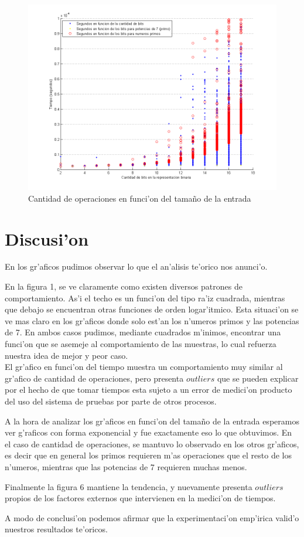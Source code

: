 \begin{figure}[H]
\centering
\includegraphics[scale=0.7]{../../codigo/ejercicio1/benchmark_de_tiempo/graficos/tamanio_Entrada_T/Tiempo_en_funcion_bits.png}
\caption{Cantidad de operaciones en funci'on del tama\~{n}o de la entrada}
\end{figure}

\section{Discusi'on}
En los gr'aficos pudimos observar lo que el an'alisis te'orico nos anunci'o.

En la figura 1, se ve claramente como existen diversos patrones de comportamiento. As'i el techo es un funci'on del tipo ra'iz 
cuadrada, mientras que debajo se encuentran otras funciones de orden logar'itmico. Esta situaci'on se ve mas claro en los 
gr'aficos donde solo est'an los n'umeros primos y las potencias de 7. En ambos casos pudimos, mediante cuadrados m'inimos, 
encontrar una funci'on que se asemeje al comportamiento de las muestras, lo cual refuerza nuestra idea de mejor y peor caso.\\
El gr'afico en funci'on del tiempo muestra un comportamiento muy similar al gr'afico de cantidad de operaciones, pero presenta 
$outliers$ que se pueden explicar por el hecho de que tomar tiempos esta sujeto a un error de medici'on producto del uso del sistema
de pruebas por parte de otros procesos.

A la hora de analizar los gr'aficos en funci'on del tama\~{n}o de la entrada esperamos ver g'raficos con forma exponencial 
y fue exactamente eso lo que obtuvimos. En el caso de cantidad de operaciones, se mantuvo lo observado en los otros gr'aficos, 
es decir que en general los primos requieren m'as operaciones que el resto de los n'umeros, mientras que las potencias de 7 
requieren muchas menos.

Finalmente la figura 6 mantiene la tendencia, y nuevamente presenta $outliers$ propios de los factores externos que intervienen 
en la medici'on de tiempos.

A modo de conclusi'on podemos afirmar que la experimentaci'on emp'irica valid'o nuestros resultados te'oricos.
